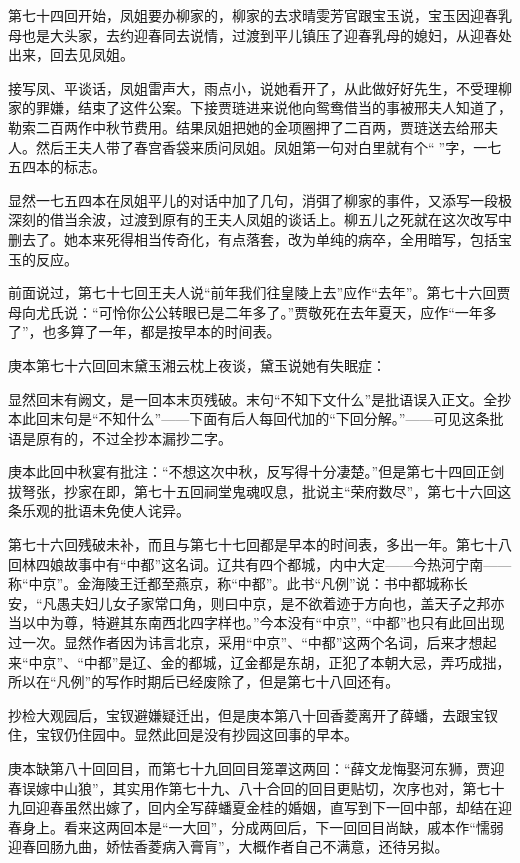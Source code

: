 \par 第七十四回开始，凤姐要办柳家的，柳家的去求晴雯芳官跟宝玉说，宝玉因迎春乳母也是大头家，去约迎春同去说情，过渡到平儿镇压了迎春乳母的媳妇，从迎春处出来，回去见凤姐。
\par 接写凤、平谈话，凤姐雷声大，雨点小，说她看开了，从此做好好先生，不受理柳家的罪嫌，结束了这件公案。下接贾琏进来说他向鸳鸯借当的事被邢夫人知道了，勒索二百两作中秋节费用。结果凤姐把她的金项圈押了二百两，贾琏送去给邢夫人。然后王夫人带了春宫香袋来质问凤姐。凤姐第一句对白里就有个“𤞘”字，一七五四本的标志。
\par 显然一七五四本在凤姐平儿的对话中加了几句，消弭了柳家的事件，又添写一段极深刻的借当余波，过渡到原有的王夫人凤姐的谈话上。柳五儿之死就在这次改写中删去了。她本来死得相当传奇化，有点落套，改为单纯的病卒，全用暗写，包括宝玉的反应。
\par 前面说过，第七十七回王夫人说“前年我们往皇陵上去”应作“去年”。第七十六回贾母向尤氏说：“可怜你公公转眼已是二年多了。”贾敬死在去年夏天，应作“一年多了”，也多算了一年，都是按早本的时间表。
\par 庚本第七十六回回末黛玉湘云枕上夜谈，黛玉说她有失眠症：
\par 显然回末有阙文，是一回本末页残破。末句“不知下文什么”是批语误入正文。全抄本此回末句是“不知什么”——下面有后人每回代加的“下回分解。”——可见这条批语是原有的，不过全抄本漏抄二字。
\par 庚本此回中秋宴有批注：“不想这次中秋，反写得十分凄楚。”但是第七十四回正剑拔弩张，抄家在即，第七十五回祠堂鬼魂叹息，批说主“荣府数尽”，第七十六回这条乐观的批语未免使人诧异。
\par 第七十六回残破未补，而且与第七十七回都是早本的时间表，多出一年。第七十八回林四娘故事中有“中都”这名词。辽共有四个都城，内中大定——今热河宁南——称“中京”。金海陵王迁都至燕京，称“中都”。此书“凡例”说：书中都城称长安，“凡愚夫妇儿女子家常口角，则曰中京，是不欲着迹于方向也，盖天子之邦亦当以中为尊，特避其东南西北四字样也。”今本没有“中京”, “中都”也只有此回出现过一次。显然作者因为讳言北京，采用“中京”、“中都”这两个名词，后来才想起来“中京”、“中都”是辽、金的都城，辽金都是东胡，正犯了本朝大忌，弄巧成拙，所以在“凡例”的写作时期后已经废除了，但是第七十八回还有。
\par 抄检大观园后，宝钗避嫌疑迁出，但是庚本第八十回香菱离开了薛蟠，去跟宝钗住，宝钗仍住园中。显然此回是没有抄园这回事的早本。
\par 庚本缺第八十回回目，而第七十九回回目笼罩这两回：“薛文龙悔娶河东狮，贾迎春误嫁中山狼”，其实用作第七十九、八十合回的回目更贴切，次序也对，第七十九回迎春虽然出嫁了，回内全写薛蟠夏金桂的婚姻，直写到下一回中部，却结在迎春身上。看来这两回本是“一大回”，分成两回后，下一回回目尚缺，戚本作“懦弱迎春回肠九曲，娇怯香菱病入膏肓”，大概作者自己不满意，还待另拟。
